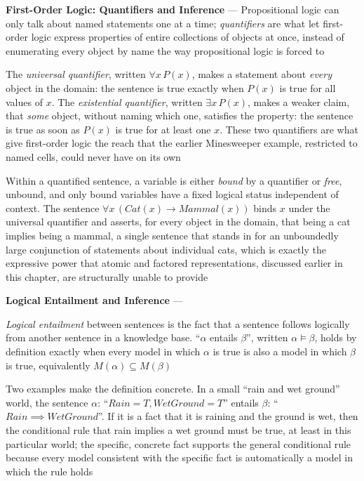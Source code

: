 \textbf{First-Order Logic: Quantifiers and Inference} --- Propositional
logic can only talk about named statements one at a time; \emph{quantifiers}
are what let first-order logic express properties of entire collections of
objects at once, instead of enumerating every object by name the way
propositional logic is forced to

The \emph{universal quantifier}, written $\forall x\, P(x)$, makes a
statement about \emph{every} object in the domain: the sentence is true
exactly when $P(x)$ is true for all values of $x$. The \emph{existential
quantifier}, written $\exists x\, P(x)$, makes a weaker claim, that
\emph{some} object, without naming which one, satisfies the property: the
sentence is true as soon as $P(x)$ is true for at least one $x$. These two
quantifiers are what give first-order logic the reach that the earlier
Minesweeper example, restricted to named cells, could never have on its
own

Within a quantified sentence, a variable is either \emph{bound} by a
quantifier or \emph{free}, unbound, and only bound variables have a fixed
logical status independent of context. The sentence $\forall x\,
(Cat(x) \rightarrow Mammal(x))$ binds $x$ under the universal quantifier
and asserts, for every object in the domain, that being a cat implies being
a mammal, a single sentence that stands in for an unboundedly large
conjunction of statements about individual cats, which is exactly the
expressive power that atomic and factored representations, discussed
earlier in this chapter, are structurally unable to provide

\textbf{Logical Entailment and Inference} --- \begin{definition}
  \emph{Logical entailment} between sentences is the fact that a sentence
  follows logically from another sentence in a knowledge base. ``$\alpha$
  entails $\beta$'', written $\alpha \models \beta$, holds by definition
  exactly when every model in which $\alpha$ is true is also a model in
  which $\beta$ is true, equivalently $M(\alpha) \subseteq M(\beta)$
\end{definition}
Two examples make the definition concrete. In a small ``rain and wet
ground'' world, the sentence $\alpha$: ``$Rain = T, WetGround = T$'' entails
$\beta$: ``$Rain \implies WetGround$''. If it is a fact that it is raining
and the ground is wet, then the conditional rule that rain implies a wet
ground must be true, at least in this particular world; the specific,
concrete fact supports the general conditional rule because every model
consistent with the specific fact is automatically a model in which the
rule holds

